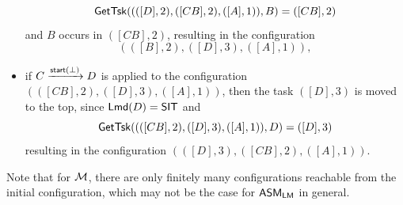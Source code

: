 \begin{example}
\begin{itemize}
			$$\mathsf{GetTsk}((([D],2),([CB],2),([A],1)), B) = ([CB],2)$$
			and $B$ occurs in $([CB], 2)$, resulting in the configuration 
			$$(([B],2),([D],3),([A],1)),$$
			\item if $C \xrightarrow{{\mathsf{start} }(\bot)} D$ is applied to the configuration $(([CB],2),([D],3),([A],1))$, then the task $([D],3)$ is moved to the top, since ${\sf Lmd}(D) = \mathsf{SIT}$ and
			$$\mathsf{GetTsk}((([CB],2),([D],3),([A],1)), D) = ([D],3)$$
			resulting in the configuration $(([D],3),([CB],2),([A],1))$.
		\end{itemize}
		Note that for ${\mathcal{M} }$, there are only finitely many configurations reachable from the initial configuration, which may not be the case for $\textsf{ASM}_\textsf{LM}$ in general.  
		

\end{example}
